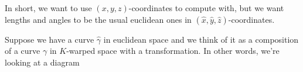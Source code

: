 \documentclass[newpage,hints,handout,12pt,noauthor,nooutcomes]{ximera}
\begin{document}
In short, we want to use $(  x,y,z)  $-coordinates to compute with,
but we want lengths and angles to be the usual euclidean ones in $(
\hat{x},\hat{y},\hat{z})  $-coordinates.

\begin{problem}
  Suppose we have a curve $\hat\gamma$ in euclidean space and we think of it as a
  composition of a curve $\gamma$ in $K$-warped space with a transformation.  In
  other words, we're looking at a diagram
  \begin{image}
\end{image}


\end{problem}
\end{document}
